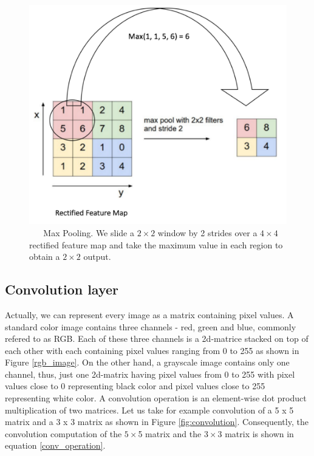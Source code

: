 \documentclass[master]{thesis-uestc}
\begin{document}
\begin{figure}[ht]
\includegraphics[width=5in]{pic/pooling.png}
\caption{\,\,\,\,\,\,\,\,\,\,Max Pooling. We slide a $2 \times 2$ window by 2 strides over a $4 \times 4$ rectified feature map and take the maximum value in each region to obtain a $2 \times 2$ output.}
\label{fig_maxpooling}
\end{figure}

\subsection{Convolution layer}
Actually, we can represent every image as a matrix containing pixel values. A standard color image contains three channels - red, green and blue, commonly refered to as RGB. Each of these three channels is a 2d-matrice stacked on top of each other with each containing pixel values ranging from 0 to 255 as shown in Figure \ref{rgb_image}. On the other hand, a grayscale image contains only one channel, thus, just one 2d-matrix having pixel values from 0 to 255 with pixel values close to 0 representing black color and pixel values close to 255 representing white color. A convolution operation is an element-wise dot product multiplication of two matrices. Let us take for example convolution of a 5 x 5 matrix and a 3 x 3 matrix as shown in Figure \ref{fig:convolution}. Consequently, the convolution computation of the $5 \times $5 matrix and the $3 \times $3 matrix is shown in equation \ref{conv_operation}.
\end{document}
